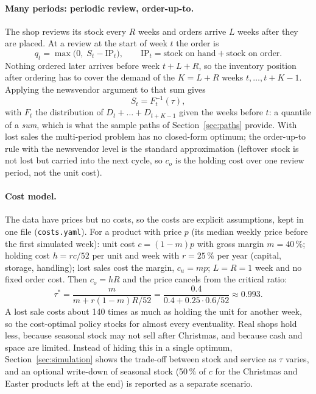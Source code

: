 \documentclass[11pt,a4paper]{article}
\begin{document}
\paragraph{Many periods: periodic review, order-up-to.} The shop reviews its stock every $R$
weeks and orders arrive $L$ weeks after they are placed. At a review at the start of week $t$
the order is
\begin{equation}
  q_t = \max\bigl(0,\; S_t - \text{IP}_t\bigr), \qquad
  \text{IP}_t = \text{stock on hand} + \text{stock on order}.
\end{equation}
Nothing ordered later arrives before week $t + L + R$, so the inventory position after
ordering has to cover the demand of the $K = L + R$ weeks $t, \dots, t + K - 1$. Applying the
newsvendor argument to that sum gives
\begin{equation}
  S_t = F_t^{-1}(\tau),
\end{equation}
with $F_t$ the distribution of $D_t + \dots + D_{t+K-1}$ given the weeks before $t$: a quantile
of a \emph{sum}, which is what the sample paths of Section~\ref{sec:paths} provide.
With lost sales the multi-period problem has no closed-form optimum; the order-up-to rule
with the newsvendor level is the standard approximation (leftover stock is not lost but
carried into the next cycle, so $c_o$ is the holding cost over one review period, not the unit
cost).

\paragraph{Cost model.} The data have prices but no costs, so the costs are explicit
assumptions, kept in one file (\texttt{costs.yaml}). For a product with price $p$ (its median weekly
price before the first simulated week): unit cost $c = (1 - m)p$ with gross margin
$m = 40\,\%$; holding cost $h = r c / 52$ per unit and week with $r = 25\,\%$ per year
(capital, storage, handling); lost sales cost the margin, $c_u = m p$; $L = R = 1$ week and no
fixed order cost. Then $c_o = h R$ and the price cancels from the critical ratio:
\begin{equation}
  \tau^* = \frac{m}{m + r (1 - m) R / 52} = \frac{0.4}{0.4 + 0.25 \cdot 0.6 / 52}
  \approx 0.993 .
\end{equation}
A lost sale costs about 140 times as much as holding the unit for another week, so the
cost-optimal policy stocks for almost every eventuality. Real shops hold less, because seasonal
stock may not sell after Christmas, and because cash and space are limited. Instead of hiding
this in a single optimum, Section~\ref{sec:simulation} shows the trade-off between stock and
service as $\tau$ varies, and an optional write-down of seasonal stock (50\,\% of $c$ for the
Christmas and Easter products left at the end) is reported as a separate scenario.
\end{document}
